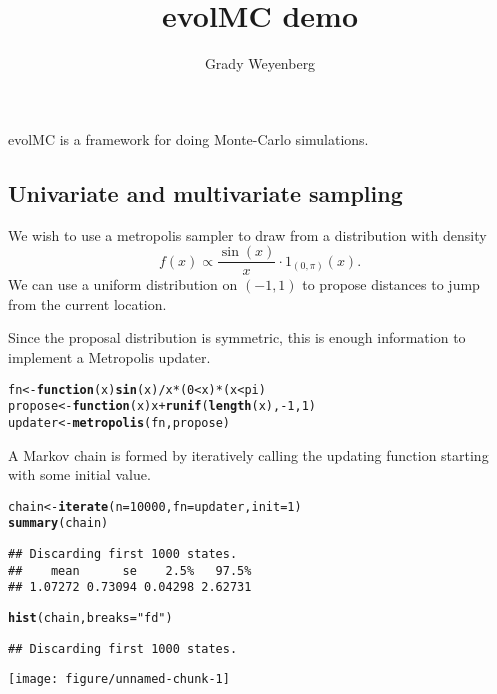 \documentclass{article}\usepackage[]{graphicx}\usepackage[]{color}
\title{evolMC demo}
\author{Grady Weyenberg}
\makeatletter
\def\maxwidth{ %
  \ifdim\Gin@nat@width>\linewidth
    \linewidth
  \else
    \Gin@nat@width
  \fi
}
\newcommand{\hlnum}[1]{\textcolor[rgb]{0.686,0.059,0.569}{#1}}%
\newcommand{\hlstr}[1]{\textcolor[rgb]{0.192,0.494,0.8}{#1}}%
\newcommand{\hlopt}[1]{\textcolor[rgb]{0,0,0}{#1}}%
\newcommand{\hlstd}[1]{\textcolor[rgb]{0.345,0.345,0.345}{#1}}%
\newcommand{\hlkwa}[1]{\textcolor[rgb]{0.161,0.373,0.58}{\textbf{#1}}}%
\newcommand{\hlkwb}[1]{\textcolor[rgb]{0.69,0.353,0.396}{#1}}%
\newcommand{\hlkwc}[1]{\textcolor[rgb]{0.333,0.667,0.333}{#1}}%
\newcommand{\hlkwd}[1]{\textcolor[rgb]{0.737,0.353,0.396}{\textbf{#1}}}%
\newenvironment{kframe}{%
 \def\at@end@of@kframe{}%
 \ifinner\ifhmode%
  \def\at@end@of@kframe{\end{minipage}}%
  \begin{minipage}{\columnwidth}%
 \fi\fi%
 \def\FrameCommand##1{\hskip\@totalleftmargin \hskip-\fboxsep
 \colorbox{shadecolor}{##1}\hskip-\fboxsep
     \hskip-\linewidth \hskip-\@totalleftmargin \hskip\columnwidth}%
 \MakeFramed {\advance\hsize-\width
   \@totalleftmargin\z@ \linewidth\hsize
   \@setminipage}}%
 {\par\unskip\endMakeFramed%
 \at@end@of@kframe}
\newenvironment{knitrout}{}{} %
\makeatother
\begin{document}
\maketitle

evolMC is a framework for doing Monte-Carlo simulations.

\subsection{Univariate and multivariate sampling}
We wish to use a metropolis sampler to draw from a distribution with
density \[ f(x) \propto \frac{\sin(x)}{x} \cdot 1_{(0,\pi)}(x). \] We
can use a uniform distribution on $(-1,1)$ to propose distances to
jump from the current location.


Since the proposal distribution is symmetric, this is enough
information to implement a Metropolis updater.

\begin{knitrout}
\color{fgcolor}\begin{kframe}
\begin{alltt}
\hlstd{fn} \hlkwb{<-} \hlkwa{function}\hlstd{(}\hlkwc{x}\hlstd{)} \hlkwd{sin}\hlstd{(x)}\hlopt{/}\hlstd{x} \hlopt{*} \hlstd{(}\hlnum{0} \hlopt{<} \hlstd{x)} \hlopt{*} \hlstd{(x} \hlopt{<} \hlstd{pi)}
\hlstd{propose} \hlkwb{<-} \hlkwa{function}\hlstd{(}\hlkwc{x}\hlstd{) x} \hlopt{+} \hlkwd{runif}\hlstd{(}\hlkwd{length}\hlstd{(x),} \hlopt{-}\hlnum{1}\hlstd{,} \hlnum{1}\hlstd{)}
\hlstd{updater} \hlkwb{<-} \hlkwd{metropolis}\hlstd{(fn, propose)}
\end{alltt}
\end{kframe}
\end{knitrout}


A Markov chain is formed by iteratively calling the updating function
starting with some initial value.
\begin{knitrout}
\color{fgcolor}\begin{kframe}
\begin{alltt}
\hlstd{chain} \hlkwb{<-} \hlkwd{iterate}\hlstd{(}\hlkwc{n} \hlstd{=} \hlnum{10000}\hlstd{,} \hlkwc{fn} \hlstd{= updater,} \hlkwc{init} \hlstd{=} \hlnum{1}\hlstd{)}
\hlkwd{summary}\hlstd{(chain)}
\end{alltt}
\begin{verbatim}
## Discarding first 1000 states.
##    mean      se    2.5%   97.5% 
## 1.07272 0.73094 0.04298 2.62731
\end{verbatim}
\begin{alltt}
\hlkwd{hist}\hlstd{(chain,} \hlkwc{breaks} \hlstd{=} \hlstr{"fd"}\hlstd{)}
\end{alltt}
\begin{verbatim}
## Discarding first 1000 states.
\end{verbatim}
\end{kframe}
\texttt{[image: figure/unnamed-chunk-1]} 

\end{knitrout}
\end{document}
